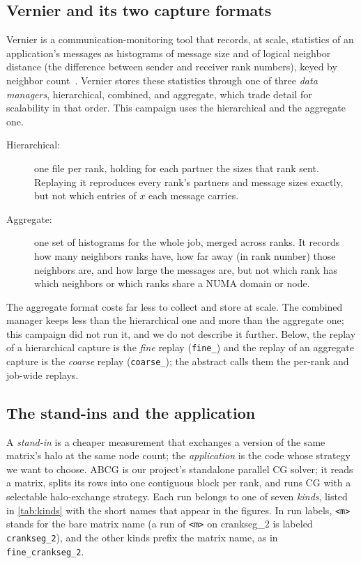 \documentclass[11pt]{article}
\newcommand{\kM}{\texttt{<m>}}
\newcommand{\kF}{\texttt{fine\_}}
\newcommand{\kC}{\texttt{coarse\_}}
\begin{document}
\subsection{Vernier and its two capture formats}

Vernier is a communication-monitoring tool that records, at scale, statistics of an
application's messages as histograms of message size and of logical neighbor distance (the
difference between sender and receiver rank numbers), keyed by neighbor
count~\cite{vernier2025}. Vernier stores these statistics through one of three
\emph{data managers}, hierarchical, combined, and aggregate, which trade detail for
scalability in that order. This campaign uses the hierarchical and the aggregate one.
\begin{description}
\item[Hierarchical:] one file per rank, holding for each partner the sizes that rank sent.
Replaying it reproduces every rank's partners and message sizes exactly, but not which
entries of $x$ each message carries.
\item[Aggregate:] one set of histograms for the whole job, merged across ranks. It records
how many neighbors ranks have, how far away (in rank number) those neighbors are, and how
large the messages are, but not which rank has which neighbors or which ranks share a NUMA
domain or node.
\end{description}
The aggregate format costs far less to collect and store at scale. The combined manager
keeps less than the hierarchical one and more than the aggregate one; this campaign did not
run it, and we do not describe it further. Below, the replay of a hierarchical capture is
the \emph{fine} replay (\kF) and the replay of an aggregate capture is the \emph{coarse}
replay (\kC); the abstract calls them the per-rank and job-wide replays.

\subsection{The stand-ins and the application}

A \emph{stand-in} is a cheaper measurement that exchanges a version of the same matrix's
halo at the same node count; the \emph{application} is the code whose strategy we want to
choose. ABCG is our project's standalone parallel CG solver; it reads a matrix, splits
its rows into one contiguous block per rank, and runs CG with a selectable halo-exchange
strategy. Each run belongs to one of seven \emph{kinds}, listed in \cref{tab:kinds} with
the short names that appear in the figures. In run labels, \kM{} stands for the bare
matrix name (a run of \kM{} on crankseg\_2 is labeled \texttt{crankseg\_2}), and the
other kinds prefix the matrix name, as in \texttt{fine\_crankseg\_2}.
\end{document}
